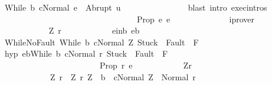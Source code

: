 \begin{isabellebody}
\ {\isachardoublequoteopen}{\isasymGamma}{\isasymturnstile}{\isasymlangle}While\ b\ c{\isacharcomma}Normal\ e{\isasymrangle}\ {\isasymRightarrow}\ Abrupt\ u{\isachardoublequoteclose}\isanewline
\ \ \ \ \ \ \ \ \ \ \ \ \ \ \isamarkupfalse%
\ {\isacharparenleft}blast\ intro{\isacharcolon}\ exec{\isachardot}intros{\isacharparenright}\isanewline
\ \ \ \ \ \ \ \ \ \ \isacommand{{\isacharbraceright}}\isamarkupfalse%
\isanewline
\ \ \ \ \ \ \ \ \ \ \isamarkupfalse%
\isanewline
\ \ \ \ \ \ \ \ \ \ \isamarkupfalse%
\ {\isachardoublequoteopen}{\isacharquery}Prop\ e\ e{\isachardoublequoteclose}\isanewline
\ \ \ \ \ \ \ \ \ \ \ \ \isamarkupfalse%
\ iprover\isanewline
\ \ \ \ \ \ \ \ \isamarkupfalse%
\isanewline
\ \ \ \ \ \ \ \ \ \ \isamarkupfalse%
\ Z\ r\isanewline
\ \ \ \ \ \ \ \ \ \ \isamarkupfalse%
\ e{\isacharunderscore}in{\isacharunderscore}b{\isacharcolon}\ {\isachardoublequoteopen}e{\isasymin}b{\isachardoublequoteclose}\ \isanewline
\ \ \ \ \ \ \ \ \ \ \isamarkupfalse%
\ WhileNoFault{\isacharcolon}\ {\isachardoublequoteopen}{\isasymGamma}{\isasymturnstile}{\isasymlangle}While\ b\ c{\isacharcomma}Normal\ Z{\isasymrangle}\ {\isasymRightarrow}{\isasymnotin}{\isacharparenleft}{\isacharbraceleft}Stuck{\isacharbraceright}\ {\isasymunion}\ Fault\ {\isacharbackquote}\ {\isacharparenleft}{\isacharminus}F{\isacharparenright}{\isacharparenright}{\isachardoublequoteclose}\isanewline
\ \ \ \ \ \ \ \ \ \ \isamarkupfalse%
\ hyp{\isacharcolon}\ {\isachardoublequoteopen}{\isasymlbrakk}e{\isasymin}b{\isacharsemicolon}{\isasymGamma}{\isasymturnstile}{\isasymlangle}While\ b\ c{\isacharcomma}Normal\ r{\isasymrangle}\ {\isasymRightarrow}{\isasymnotin}{\isacharparenleft}{\isacharbraceleft}Stuck{\isacharbraceright}\ {\isasymunion}\ Fault\ {\isacharbackquote}\ {\isacharparenleft}{\isacharminus}F{\isacharparenright}{\isacharparenright}{\isasymrbrakk}\isanewline
\ \ \ \ \ \ \ \ \ \ \ \ \ \ \ \ \ \ \ \ \ \ \ {\isasymLongrightarrow}\ {\isacharquery}Prop\ r\ e{\isachardoublequoteclose}\isanewline
\ \ \ \ \ \ \ \ \ \ \isamarkupfalse%
\ Z{\isacharunderscore}r{\isacharcolon}\isanewline
\ \ \ \ \ \ \ \ \ \ \ \ {\isachardoublequoteopen}{\isacharparenleft}Z{\isacharcomma}\ r{\isacharparenright}\ {\isasymin}\ {\isacharbraceleft}{\isacharparenleft}Z{\isacharcomma}\ r{\isacharparenright}{\isachardot}\ Z\ {\isasymin}\ b\ {\isasymand}\ {\isasymGamma}{\isasymturnstile}{\isasymlangle}c{\isacharcomma}Normal\ Z{\isasymrangle}\ {\isasymRightarrow}\ Normal\ r{\isacharbraceright}{\isachardoublequoteclose}\isanewline

\end{isabellebody}
